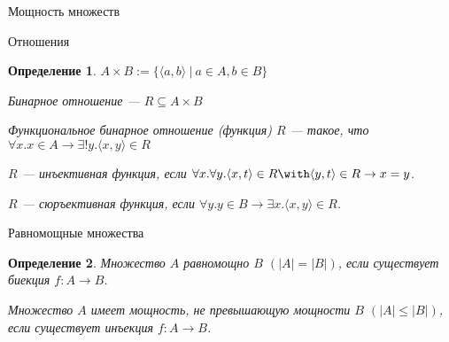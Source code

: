 \documentclass[aspectratio=169]{beamer}
\newtheorem{dfn}{Определение}[section]
\begin{document}
\newcommand\doubleplus{+\kern-1.3ex+\kern0.8ex}
\newcommand\mdoubleplus{\ensuremath{\mathbin{+\mkern-10mu+}}}

\begin{frame}{}
\LARGE\begin{center}Мощность множеств\end{center}
\end{frame}

\begin{frame}{Отношения}
\begin{dfn}$A \times B := \{\langle a,b \rangle\ |\ a \in A, b \in B\}$

Бинарное отношение --- $R \subseteq A \times B$

Функциональное бинарное отношение (функция) $R$ --- такое, что $\forall x.x\in A\rightarrow\exists !y.\langle x,y\rangle \in R$

$R$ --- инъективная функция, если $\forall x.\forall y.\langle x,t\rangle \in R\with \langle y,t\rangle \in R \rightarrow x=y$.

$R$ --- сюръективная функция, если $\forall y.y \in B\rightarrow\exists x.\langle x,y\rangle\in R$.\end{dfn}
\end{frame}

\begin{frame}{Равномощные множества}
\begin{dfn}Множество $A$ \emph{равномощно} $B$ $(|A|=|B|)$, если существует биекция
$f: A \rightarrow B$.

Множество $A$ имеет мощность, не превышающую мощности $B$ $(|A|\le|B|)$, если существует инъекция $f: A \rightarrow B$.
\end{dfn}
\end{frame}
\end{document}
